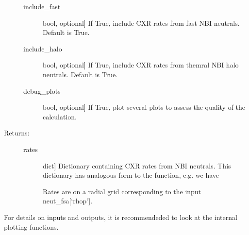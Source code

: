 \documentclass[letterpaper,10pt,english]{sphinxmanual}
\begin{document}
\begin{fulllineitems}
\begin{description}
\begin{description}
\item[{include\_fast}] \leavevmode{[}bool, optional{]}
If True, include CXR rates from fast NBI neutrals. Default is True.

\item[{include\_halo}] \leavevmode{[}bool, optional{]}
If True, include CXR rates from themral NBI halo neutrals. Default is True.

\item[{debug\_plots}] \leavevmode{[}bool, optional{]}
If True, plot several plots to assess the quality of the calculation.

\end{description}

\item[{Returns:}] \leavevmode\begin{description}
\item[{rates}] \leavevmode{[}dict{]}
Dictionary containing CXR rates from NBI neutrals. This dictionary has analogous form to the 
{\hyperref[\detokenize{aurora:aurora.nbi_neutrals.get_neutrals_fsa}]{}} function, e.g. we have

\begin{sphinxVerbatim}[commandchars=\\\{\}]
\PYG{p}{[}\PYG{p}{]}\PYG{p}{[}\PYG{p}{]}\PYG{p}{[}\PYG{p}{]}
\end{sphinxVerbatim}

Rates are on a radial grid corresponding to the input neut\_fsa{[}‘rhop’{]}.

\end{description}

\end{description}

For details on inputs and outputs, it is recommendeded to look at the internal plotting functions.

\end{fulllineitems}


\begin{fulllineitems}
\label{\detokenize{aurora:aurora.nbi_neutrals.get_ls_cycle}}
\end{fulllineitems}
\end{document}

